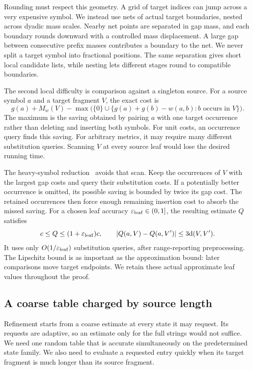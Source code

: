 \documentclass[11pt]{article}
\theoremstyle{definition}
\newcommand{\dd}{\mathrm d}
\newcommand{\1}{\mathbf 1}
\begin{document}
Rounding must respect this geometry.
A grid of target indices can jump across a very expensive symbol.
We instead use nets of actual target boundaries, nested across dyadic
mass scales. Nearby net points are separated in gap mass, and each
boundary rounds downward with a controlled mass displacement.
A large gap between consecutive prefix masses contributes a boundary
to the net. We never split a target symbol into fractional positions.
The same separation gives short local candidate lists, while nesting
lets different stages round to compatible boundaries.

The second local difficulty is comparison against a singleton source.
For a source symbol $a$ and a target fragment $V$, the exact cost is
\[
 g(a)+M_w(V)
 -\max\bigl(
 \{0\}\cup
 \{g(a)+g(b)-w(a,b): b\text{ occurs in }V\}
 \bigr).
\]
The maximum is the saving obtained by pairing $a$ with one target
occurrence rather than deleting and inserting both symbols.
For unit costs, an occurrence query finds this saving.
For arbitrary metrics, it may require many different substitution
queries. Scanning $V$ at every source leaf would lose the desired
running time.

The heavy-symbol reduction~\cite{dkk} avoids that scan.
Keep the occurrences of $V$ with the largest gap costs and query their
substitution costs. If a potentially better occurrence is omitted,
its possible saving is bounded by twice its gap cost.
The retained occurrences then force enough remaining insertion cost
to absorb the missed saving.
For a chosen leaf accuracy $\varepsilon_{\rm leaf}\in(0,1]$, the resulting
estimate $Q$ satisfies
\[
 c\le Q\le(1+\varepsilon_{\rm leaf})c,
 \qquad
 |Q(a,V)-Q(a,V')|\le3\dd(V,V').
\]
It uses only $O(1/\varepsilon_{\rm leaf})$ substitution queries,
after range-reporting preprocessing.
The Lipschitz bound is as important as the approximation bound:
later comparisons move target endpoints.
We retain these actual approximate leaf values throughout the proof.

\subsection{A coarse table charged by source length}

Refinement starts from a coarse estimate at every state it may request.
Its requests are adaptive, so an estimate only for the full strings
would not suffice. We need one random table that is accurate
simultaneously on the predetermined state family.
We also need to evaluate a requested entry quickly when its target
fragment is much longer than its source fragment.
\end{document}
